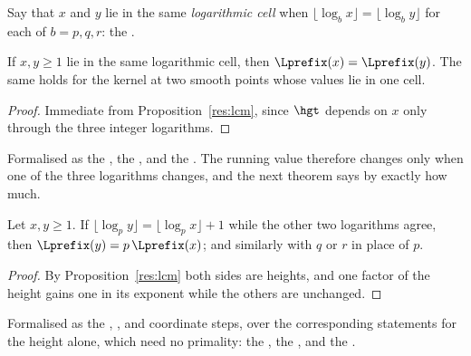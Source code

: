 Say that $x$ and $y$ lie in the same \emph{logarithmic cell} when
$\lfloor\log_b x\rfloor=\lfloor\log_b y\rfloor$ for each of $b=p,q,r$: the
.

\begin{theorem}\label{res:cell}
If $x,y\ge1$ lie in the same logarithmic cell, then
$\Lprefix(x)=\Lprefix(y)$.  The same holds for the kernel at two smooth points
whose values lie in one cell.
\end{theorem}

\begin{proof}
Immediate from Proposition~\ref{res:lcm}, since $\hgt$ depends on $x$ only
through the three integer logarithms.
\end{proof}

\noindent Formalised as the
, the
, and the
.  The running value therefore changes only when one of
the three logarithms changes, and the next theorem says by exactly how much.

\begin{theorem}\label{res:jump}
Let $x,y\ge1$.  If $\lfloor\log_p y\rfloor=\lfloor\log_p x\rfloor+1$ while the
other two logarithms agree, then $\Lprefix(y)=p\,\Lprefix(x)$; and similarly
with $q$ or $r$ in place of $p$.
\end{theorem}

\begin{proof}
By Proposition~\ref{res:lcm} both sides are heights, and one factor of the height
gains one in its exponent while the others are unchanged.
\end{proof}

\noindent Formalised as the
,
,
and
coordinate steps, over the corresponding statements for the height alone, which
need no primality: the
, the
,
and the
.

